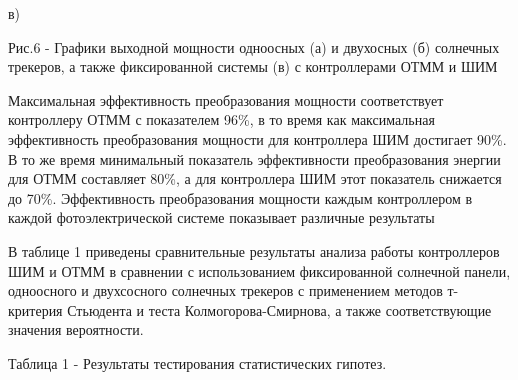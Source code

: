 в)

Рис.6 - Графики выходной мощности одноосных (а) и двухосных (б)
солнечных трекеров, а также фиксированной системы (в) с контроллерами
ОТММ и ШИМ

\begin{multicols}{2}
Максимальная эффективность преобразования мощности соответствует
контроллеру ОТММ с показателем 96\%, в то время как максимальная
эффективность преобразования мощности для контроллера ШИМ достигает
90\%. В то же время минимальный показатель эффективности преобразования
энергии для ОТММ составляет 80\%, а для контроллера ШИМ этот показатель
снижается до 70\%. Эффективность преобразования мощности каждым
контроллером в каждой фотоэлектрической системе показывает различные
результаты

В таблице 1 приведены сравнительные результаты анализа работы
контроллеров ШИМ и ОТММ в сравнении с использованием фиксированной
солнечной панели, одноосного и двухсосного солнечных трекеров с
применением методов т-критерия Стьюдента и теста Колмогорова-Смирнова, а
также соответствующие значения вероятности.
\end{multicols}

Таблица 1 - Результаты тестирования статистических гипотез.

